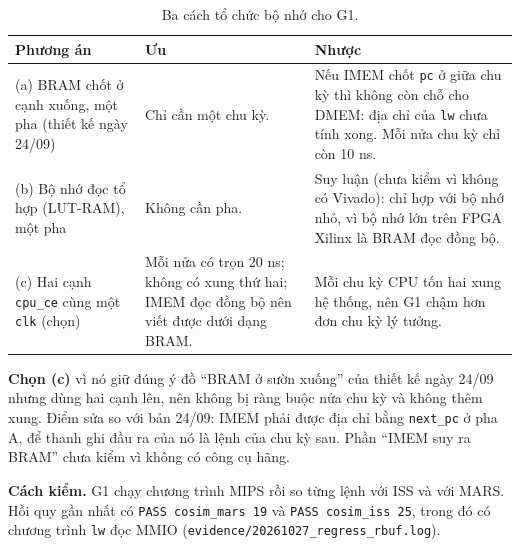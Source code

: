 \begin{table}[htbp]
\centering\small
\begin{tabular}{@{}p{4.3cm} p{4.6cm} p{4.6cm}@{}}
\toprule
Phương án & Ưu & Nhược \\
\midrule
(a) BRAM chốt ở cạnh xuống, một pha (thiết kế ngày 24/09) & Chỉ cần một chu kỳ. & Nếu IMEM chốt \texttt{pc} ở giữa chu kỳ thì không còn chỗ cho DMEM: địa chỉ của \texttt{lw} chưa tính xong. Mỗi nửa chu kỳ chỉ còn 10 ns. \\
(b) Bộ nhớ đọc tổ hợp (LUT-RAM), một pha & Không cần pha. & Suy luận (chưa kiểm vì không có Vivado): chỉ hợp với bộ nhớ nhỏ, vì bộ nhớ lớn trên FPGA Xilinx là BRAM đọc đồng bộ. \\
(c) Hai cạnh \texttt{cpu\_ce} cùng một \texttt{clk} (chọn) & Mỗi nửa có trọn 20 ns; không có xung thứ hai; IMEM đọc đồng bộ nên viết được dưới dạng BRAM. & Mỗi chu kỳ CPU tốn hai xung hệ thống, nên G1 chậm hơn đơn chu kỳ lý tưởng. \\
\bottomrule
\end{tabular}
\caption{Ba cách tổ chức bộ nhớ cho G1.}\label{tab:vi-sao-2pha}
\end{table}

\textbf{Chọn (c)} vì nó giữ đúng ý đồ ``BRAM ở sườn xuống'' của thiết kế ngày 24/09 nhưng dùng hai cạnh lên, nên không bị ràng buộc nửa chu kỳ và không thêm xung. Điểm sửa so với bản 24/09: IMEM phải được địa chỉ bằng \texttt{next\_pc} ở pha A, để thanh ghi đầu ra của nó là lệnh của chu kỳ sau. Phần ``IMEM suy ra BRAM'' chưa kiểm vì không có công cụ hãng.

\textbf{Cách kiểm.} G1 chạy chương trình MIPS rồi so từng lệnh với ISS và với MARS. Hồi quy gần nhất có \texttt{PASS cosim\_mars 19} và \texttt{PASS cosim\_iss 25}, trong đó có chương trình \texttt{lw} đọc MMIO (\texttt{evidence/20261027\_regress\_rbuf.log}).

